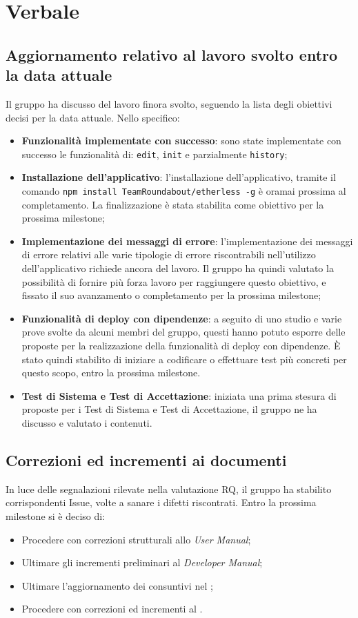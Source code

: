 \section{Verbale}

	\subsection{Aggiornamento relativo al lavoro svolto entro la data attuale}
	Il gruppo ha discusso del lavoro finora svolto, seguendo la lista degli obiettivi decisi per la data attuale. Nello specifico:
	\begin{itemize}
		\item \textbf{Funzionalità implementate con successo}: sono state implementate con successo le funzionalità di: \texttt{edit}, \texttt{init} e parzialmente \texttt{history}; 
		\item \textbf{Installazione dell'applicativo}: l'installazione dell'applicativo, tramite il comando \texttt{npm install TeamRoundabout/etherless -g} è oramai prossima al completamento. La finalizzazione è stata stabilita come obiettivo per la prossima milestone;
		\item \textbf{Implementazione dei messaggi di errore}: l'implementazione dei messaggi di errore relativi alle varie tipologie di errore riscontrabili nell'utilizzo dell'applicativo richiede ancora del lavoro. Il gruppo ha quindi valutato la possibilità di fornire più forza lavoro per raggiungere questo obiettivo, e fissato il suo avanzamento o completamento per la prossima milestone;
		\item \textbf{Funzionalità di deploy con dipendenze}: a seguito di uno studio e varie prove svolte da alcuni membri del gruppo, questi hanno potuto esporre delle proposte per la realizzazione della funzionalità di deploy con dipendenze. È stato quindi stabilito di iniziare a codificare o effettuare test più concreti per questo scopo, entro la prossima milestone.
		\item \textbf{Test di Sistema e Test di Accettazione}: iniziata una prima stesura di proposte per i Test di Sistema e Test di Accettazione, il gruppo ne ha discusso e valutato i contenuti.
	\end{itemize}
	\subsection{Correzioni ed incrementi ai documenti}
		In luce delle segnalazioni rilevate nella valutazione RQ, il gruppo ha stabilito corrispondenti Issue, volte a sanare i difetti riscontrati. Entro la prossima milestone si è deciso di:
		\begin{itemize}
			\item Procedere con correzioni strutturali allo \textit{User Manual};
			\item Ultimare gli incrementi preliminari al \textit{Developer Manual};
			\item Ultimare l'aggiornamento dei consuntivi nel \PdP{};
			\item Procedere con correzioni ed incrementi al \PdQ{}.
		\end{itemize}
